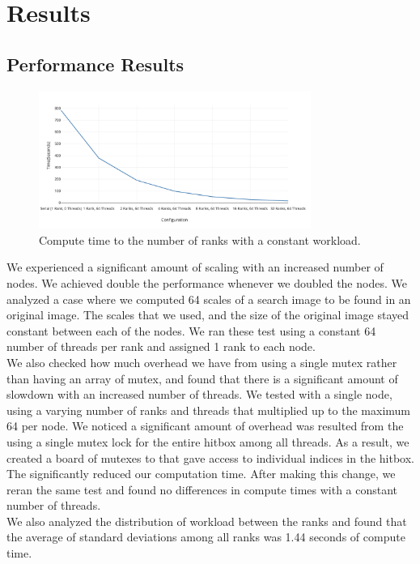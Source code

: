 \documentclass[10pt, journal]{vgtc}                %
\begin{document}
\section{Results}

\subsection{Performance Results}
\begin{flushleft}
	\begin{figure}[h!]
		\centering
		\includegraphics[width=3.5in]{scaling_performance.png}
		\caption{Compute time to the number of ranks with a constant workload.}
	\end{figure}
We experienced a significant amount of scaling with an increased number of nodes. We achieved double the performance whenever we doubled the nodes. We analyzed a case where we computed 64 scales of a search image to be found in an original image. The scales that we used, and the size of the original image stayed constant between each of the nodes. We ran these test using a constant 64 number of threads per rank and assigned 1 rank to each node.\\\smallskip
We also checked how much overhead we have from using a single mutex rather than having an array of mutex, and found that there is a significant amount of slowdown with an increased number of threads. We tested with a single node, using a varying number of ranks and threads that multiplied up to the maximum 64 per node. We noticed a significant amount of overhead was resulted from the using a single mutex lock for the entire hitbox among all threads. As a result, we created a board of mutexes to that gave access to individual indices in the hitbox. The significantly reduced our computation time. After making this change, we reran the same test and found no differences in compute times with a constant number of threads. \\\smallskip
We also analyzed the distribution of workload between the ranks and found that the average of standard deviations among all ranks was 1.44 seconds of compute time. 
\end{flushleft}
\end{document}
